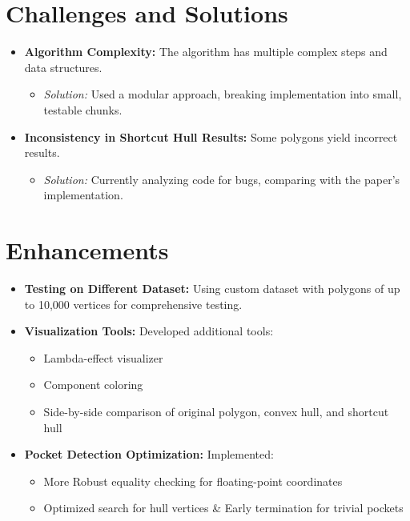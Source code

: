 \documentclass[11pt]{article}
\begin{document}
\section{Challenges and Solutions}
\begin{itemize}[leftmargin=*, noitemsep]
  \item \textbf{Algorithm Complexity:} The algorithm has multiple complex steps and data structures.
  \begin{itemize}[noitemsep]
    \item \emph{Solution:} Used a modular approach, breaking implementation into small, testable chunks.
  \end{itemize}
  
  \item \textbf{Inconsistency in Shortcut Hull Results:} Some polygons yield incorrect results.
  \begin{itemize}[noitemsep]
    \item \emph{Solution:} Currently analyzing code for bugs, comparing with the paper's implementation.
  \end{itemize}
\end{itemize}

\section{Enhancements}
\begin{itemize}[leftmargin=*, noitemsep]
  \item \textbf{Testing on Different Dataset:} Using custom dataset with polygons of up to 10,000 vertices for comprehensive testing.
  
  \item \textbf{Visualization Tools:} Developed additional tools:
  \begin{itemize}[noitemsep]
    \item Lambda-effect visualizer
    \item Component coloring
    \item Side-by-side comparison of original polygon, convex hull, and shortcut hull
  \end{itemize}
  
  \item \textbf{Pocket Detection Optimization:} Implemented:
  \begin{itemize}[noitemsep]
    \item More Robust equality checking for floating-point coordinates
    \item Optimized search for hull vertices \& Early termination for trivial pockets
  \end{itemize}
\end{itemize}
\end{document}
